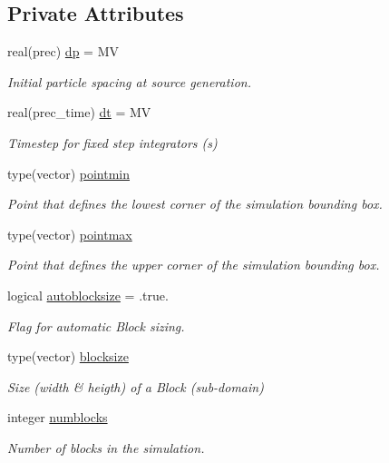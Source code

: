 \subsection*{Private Attributes}
\begin{DoxyCompactItemize}
\item 
real(prec) \hyperlink{structsimulation__globals__mod_1_1simdefs__t_af730c363daf57cdb66206b7cc7e3d8ff}{dp} = MV
\begin{DoxyCompactList}\small\item\em Initial particle spacing at source generation. \end{DoxyCompactList}\item 
real(prec\+\_\+time) \hyperlink{structsimulation__globals__mod_1_1simdefs__t_acc8df5cd09283215deb732d97b44f1dc}{dt} = MV
\begin{DoxyCompactList}\small\item\em Timestep for fixed step integrators (s) \end{DoxyCompactList}\item 
type(vector) \hyperlink{structsimulation__globals__mod_1_1simdefs__t_af3a5fb325c955840515f199c8be30aa7}{pointmin}
\begin{DoxyCompactList}\small\item\em Point that defines the lowest corner of the simulation bounding box. \end{DoxyCompactList}\item 
type(vector) \hyperlink{structsimulation__globals__mod_1_1simdefs__t_a0437ce61f2882028c5e3ca0212aeaf24}{pointmax}
\begin{DoxyCompactList}\small\item\em Point that defines the upper corner of the simulation bounding box. \end{DoxyCompactList}\item 
logical \hyperlink{structsimulation__globals__mod_1_1simdefs__t_a3ff72d630a17daa1ca1494e67bc6d087}{autoblocksize} = .true.
\begin{DoxyCompactList}\small\item\em Flag for automatic Block sizing. \end{DoxyCompactList}\item 
type(vector) \hyperlink{structsimulation__globals__mod_1_1simdefs__t_a7ed40e8b9c4062d6e461b6187c3115b1}{blocksize}
\begin{DoxyCompactList}\small\item\em Size (width \& heigth) of a Block (sub-\/domain) \end{DoxyCompactList}\item 
integer \hyperlink{structsimulation__globals__mod_1_1simdefs__t_a6b7497df8a36fe045f2096963db3bdde}{numblocks}
\begin{DoxyCompactList}\small\item\em Number of blocks in the simulation. \end{DoxyCompactList}\end{DoxyCompactItemize}


